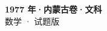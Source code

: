 \documentclass[zihao=-4, a4paper]{ctexart}
\begin{document}
\begin{center}
  {\Large\bfseries 1977 年·内蒙古卷·文科}\\[4pt]
  {\large 数学 · 试题版}
\end{center}
\medskip
{}

\end{document}
